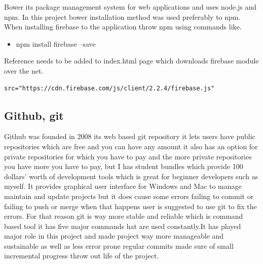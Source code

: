 \bigbreak

Bower its package management system for web applications and uses node.js and npm.
In this project bower installation method was used preferably to npm. When installing firebase to the application throw npm using commands like.

\begin{itemize}
	\item npm install firebase –save
\end{itemize}
Reference needs to be added to index.html page which downloads firebase module over the net.


\begin{verbatim}
src="https://cdn.firebase.com/js/client/2.2.4/firebase.js"
\end{verbatim}




\subsection{Github, git}
\bigbreak
Github was founded in 2008 its web based git repository it lets users have public repositories which are free and you can have any amount it also has an option for private repositories for which you have to pay and the more private repositories you have more you have to pay, but I has student bundles which provide 100 dollars’ worth of development tools which is great for beginner developers such as myself. It provides graphical user interface for Windows and Mac to manage maintain and update projects but it does cause some errors failing to commit or failing to push or merge when that happens user is suggested to use git to fix the errors. For that reason git is way more stable and reliable which is command based tool it has five major commands hat are used constantly.It has played major role in this project and made project way more manageable and sustainable as well as less error prone regular commits made sure of small incremental progress throw out life of the project.


